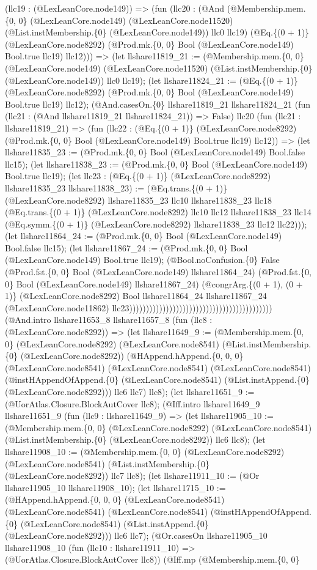 \documentclass[11pt]{article}
\begin{document}
(llc19 : (@LexLeanCore.node149)) => (fun (llc20 : (@And (@Membership.mem.\{0, 0\} (@LexLeanCore.node149) (@LexLeanCore.node11520) (@List.instMembership.\{0\} (@LexLeanCore.node149)) llc0 llc19) (@Eq.\{(0 + 1)\} (@LexLeanCore.node8292) (@Prod.mk.\{0, 0\} Bool (@LexLeanCore.node149) Bool.true llc19) llc12))) => (let llshare11819\_21 := (@Membership.mem.\{0, 0\} (@LexLeanCore.node149) (@LexLeanCore.node11520) (@List.instMembership.\{0\} (@LexLeanCore.node149)) llc0 llc19); (let llshare11824\_21 := (@Eq.\{(0 + 1)\} (@LexLeanCore.node8292) (@Prod.mk.\{0, 0\} Bool (@LexLeanCore.node149) Bool.true llc19) llc12); (@And.casesOn.\{0\} llshare11819\_21 llshare11824\_21 (fun (llc21 : (@And llshare11819\_21 llshare11824\_21)) => False) llc20 (fun (llc21 : llshare11819\_21) => (fun (llc22 : (@Eq.\{(0 + 1)\} (@LexLeanCore.node8292) (@Prod.mk.\{0, 0\} Bool (@LexLeanCore.node149) Bool.true llc19) llc12)) => (let llshare11835\_23 := (@Prod.mk.\{0, 0\} Bool (@LexLeanCore.node149) Bool.false llc15); (let llshare11838\_23 := (@Prod.mk.\{0, 0\} Bool (@LexLeanCore.node149) Bool.true llc19); (let llc23 : (@Eq.\{(0 + 1)\} (@LexLeanCore.node8292) llshare11835\_23 llshare11838\_23) := (@Eq.trans.\{(0 + 1)\} (@LexLeanCore.node8292) llshare11835\_23 llc10 llshare11838\_23 llc18 (@Eq.trans.\{(0 + 1)\} (@LexLeanCore.node8292) llc10 llc12 llshare11838\_23 llc14 (@Eq.symm.\{(0 + 1)\} (@LexLeanCore.node8292) llshare11838\_23 llc12 llc22))); (let llshare11864\_24 := (@Prod.mk.\{0, 0\} Bool (@LexLeanCore.node149) Bool.false llc15); (let llshare11867\_24 := (@Prod.mk.\{0, 0\} Bool (@LexLeanCore.node149) Bool.true llc19); (@Bool.noConfusion.\{0\} False (@Prod.fst.\{0, 0\} Bool (@LexLeanCore.node149) llshare11864\_24) (@Prod.fst.\{0, 0\} Bool (@LexLeanCore.node149) llshare11867\_24) (@congrArg.\{(0 + 1), (0 + 1)\} (@LexLeanCore.node8292) Bool llshare11864\_24 llshare11867\_24 (@LexLeanCore.node11862) llc23))))))))))))))))))))))))))))))))))))))))))) (@And.intro llshare11653\_8 llshare11657\_8 (fun (llc8 : (@LexLeanCore.node8292)) => (let llshare11649\_9 := (@Membership.mem.\{0, 0\} (@LexLeanCore.node8292) (@LexLeanCore.node8541) (@List.instMembership.\{0\} (@LexLeanCore.node8292)) (@HAppend.hAppend.\{0, 0, 0\} (@LexLeanCore.node8541) (@LexLeanCore.node8541) (@LexLeanCore.node8541) (@instHAppendOfAppend.\{0\} (@LexLeanCore.node8541) (@List.instAppend.\{0\} (@LexLeanCore.node8292))) llc6 llc7) llc8); (let llshare11651\_9 := (@UorAtlas.Closure.BlockAutCover llc8); (@Iff.intro llshare11649\_9 llshare11651\_9 (fun (llc9 : llshare11649\_9) => (let llshare11905\_10 := (@Membership.mem.\{0, 0\} (@LexLeanCore.node8292) (@LexLeanCore.node8541) (@List.instMembership.\{0\} (@LexLeanCore.node8292)) llc6 llc8); (let llshare11908\_10 := (@Membership.mem.\{0, 0\} (@LexLeanCore.node8292) (@LexLeanCore.node8541) (@List.instMembership.\{0\} (@LexLeanCore.node8292)) llc7 llc8); (let llshare11911\_10 := (@Or llshare11905\_10 llshare11908\_10); (let llshare11715\_10 := (@HAppend.hAppend.\{0, 0, 0\} (@LexLeanCore.node8541) (@LexLeanCore.node8541) (@LexLeanCore.node8541) (@instHAppendOfAppend.\{0\} (@LexLeanCore.node8541) (@List.instAppend.\{0\} (@LexLeanCore.node8292))) llc6 llc7); (@Or.casesOn llshare11905\_10 llshare11908\_10 (fun (llc10 : llshare11911\_10) => (@UorAtlas.Closure.BlockAutCover llc8)) (@Iff.mp (@Membership.mem.\{0, 0\} 
\end{document}
